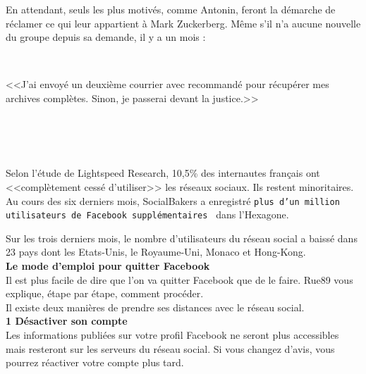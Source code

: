 \documentclass[11pt,twoside,a4paper]{article}
\begin{document}
En attendant, seuls les plus motiv{\'e}s, comme Antonin, feront la d{\'e}marche de r{\'e}clamer ce qui leur appartient {\`a} Mark Zuckerberg. M{\^e}me s'il n'a aucune nouvelle du groupe depuis sa demande, il y a un mois : ~\\

\begin{minipage}[h]{0.10\textwidth} ~\\ \end{minipage} \hfill \begin{minipage}[h]{0.70\textwidth}
	<<J'ai envoy{\'e} un deuxi{\`e}me courrier avec recommand{\'e} pour r{\'e}cup{\'e}rer mes archives compl{\`e}tes. Sinon, je passerai devant la justice.>>
\end{minipage} \hfill \begin{minipage}[h]{0.15\textwidth} ~\\ \end{minipage} ~\\~\\

Selon l'{\'e}tude de Lightspeed Research, 10,5\% des internautes fran\c{c}ais ont <<compl{\`e}tement cess{\'e} d'utiliser>> les r{\'e}seaux sociaux. Ils restent minoritaires. Au cours des six derniers mois, SocialBakers a enregistr{\'e} \texttt{plus d'un million utilisateurs de Facebook suppl{\'e}mentaires~\footnotemark} dans l'Hexagone. ~\\

Sur les trois derniers mois, le nombre d'utilisateurs du r{\'e}seau social a baiss{\'e} dans 23 pays dont les Etats-Unis, le Royaume-Uni, Monaco et Hong-Kong. ~\\

\textbf{Le mode d'emploi pour quitter Facebook}~\\

Il est plus facile de dire que l'on va quitter Facebook que de le faire. Rue89 vous explique, {\'e}tape par {\'e}tape, comment proc{\'e}der. ~\\

Il existe deux mani{\`e}res de prendre ses distances avec le r{\'e}seau social. ~\\

\textbf{1 D{\'e}sactiver son compte}~\\

Les informations publi{\'e}es sur votre profil Facebook ne seront plus accessibles mais resteront sur les serveurs du r{\'e}seau social. Si vous changez d'avis, vous pourrez r{\'e}activer votre compte plus tard. ~\\
\end{document}

